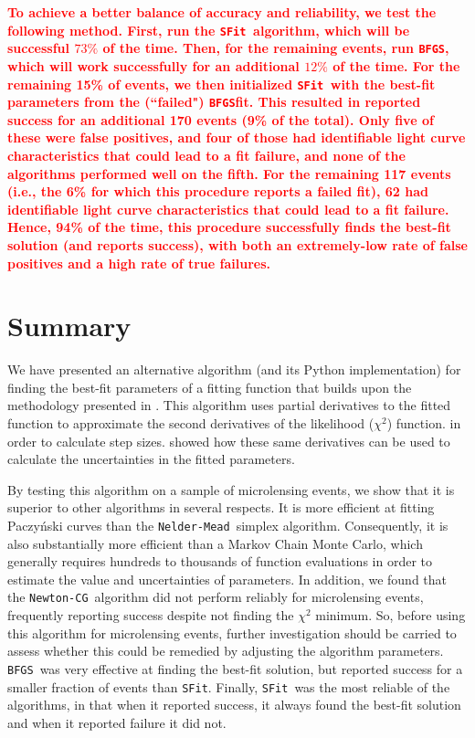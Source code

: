 \documentclass[preprint]{aastex631}
\newcommand{\HL}[1]{\textcolor{red}{\bf#1}}
\newcommand{\neldarmead}{\texttt{Nelder-Mead}}
\newcommand{\newtoncg}{\texttt{Newton-CG}}
\newcommand{\bfgs}{\texttt{BFGS}}
\newcommand{\sfit}{\texttt{SFit}}
\begin{document}
\HL{To achieve a better balance of accuracy and reliability, we test the following method. First, run the \sfit\, algorithm, which will be successful $73\%$ of the time. Then, for the remaining events, run \bfgs, which will work successfully for an additional $12\%$ of the time. For the remaining 15\% of events, we then initialized \sfit\, with the best-fit parameters from the (``failed") \bfgs fit. This resulted in reported success for an additional 170 events (9\% of the total). Only five of these were false positives, and four of those had identifiable light curve characteristics that could lead to a fit failure, and none of the algorithms performed well on the fifth. For the remaining 117 events (i.e., the 6\% for which this procedure reports a failed fit), 62 had identifiable light curve characteristics that could lead to a fit failure. Hence, 94\% of the time, this procedure successfully finds the best-fit solution (and reports success), with both an extremely-low rate of false positives and a high rate of true failures.}

\section{Summary}

We have presented an alternative algorithm (and its Python implementation) for finding the best-fit parameters of a fitting function that builds upon the methodology presented in \citet{Gould03}. This algorithm uses partial derivatives to the fitted function to approximate the second derivatives of the likelihood ($\chi^2$) function. in order to calculate step sizes. \citet{Gould03} showed how these same derivatives can be used to calculate the uncertainties in the fitted parameters. 

By testing this algorithm on a sample of microlensing events, we show that it is superior to other algorithms in several respects. It is more efficient at fitting Paczy\'{n}ski curves than the \neldarmead\, simplex algorithm. Consequently, it is also substantially more efficient than a Markov Chain Monte Carlo, which generally requires hundreds to thousands of function evaluations in order to estimate the value and uncertainties of parameters. In addition, we found that the \newtoncg\, algorithm did not perform reliably for microlensing events, frequently reporting success despite not finding the $\chi^2$ minimum. So, before using this algorithm for microlensing events, further investigation should be carried to assess whether this could be remedied by adjusting the algorithm parameters.  
\bfgs\, was very effective at finding the best-fit solution, but reported success for a smaller fraction of events than \sfit.
Finally, \sfit\, was the most reliable of the algorithms, in that when it reported success, it always found the best-fit solution and when it reported failure it did not.
\end{document}
